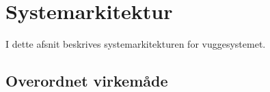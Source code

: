 \section{Systemarkitektur}

I dette afsnit beskrives systemarkitekturen for vuggesystemet.

\subsection*{Overordnet virkemåde}
